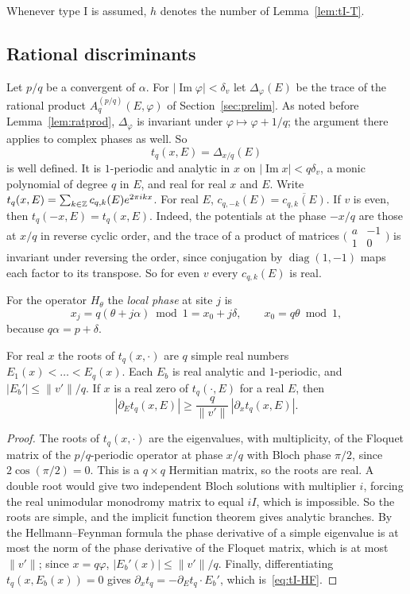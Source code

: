 Whenever type I is assumed, $h$ denotes the number of Lemma~\ref{lem:tI-T}.

\subsection{Rational discriminants}\label{sec:tI-disc}

Let $p/q$ be a convergent of $\alpha$. For $|\operatorname{Im}\varphi|<\delta_v$ let $\Delta_\varphi(E)$ be the trace of the rational product $A^{(p/q)}_q(E,\varphi)$ of Section~\ref{sec:prelim}. As noted before Lemma~\ref{lem:ratprod}, $\Delta_\varphi$ is invariant under $\varphi\mapsto\varphi+1/q$; the argument there applies to complex phases as well. So
\[
t_q(x,E)=\Delta_{x/q}(E)
\]
is well defined. It is $1$-periodic and analytic in $x$ on $|\operatorname{Im}x|<q\delta_v$, a monic polynomial of degree $q$ in $E$, and real for real $x$ and $E$. Write $t_q(x,E)=\sum_{k\in\mathbb Z}c_{q,k}(E)e^{2\pi ikx}$. For real $E$, $c_{q,-k}(E)=\overline{c_{q,k}(E)}$. If $v$ is even, then $t_q(-x,E)=t_q(x,E)$. Indeed, the potentials at the phase $-x/q$ are those at $x/q$ in reverse cyclic order, and the trace of a product of matrices $\bigl(\begin{smallmatrix}a&-1\\1&0\end{smallmatrix}\bigr)$ is invariant under reversing the order, since conjugation by $\operatorname{diag}(1,-1)$ maps each factor to its transpose. So for even $v$ every $c_{q,k}(E)$ is real.

For the operator $H_\theta$ the \emph{local phase} at site $j$ is
\[
x_j=q(\theta+j\alpha)\bmod1=x_0+j\delta,\qquad x_0=q\theta\bmod 1,
\]
because $q\alpha=p+\delta$.

\begin{lemma}\label{lem:tI-bc}
For real $x$ the roots of $t_q(x,\cdot)$ are $q$ simple real numbers $E_1(x)<\dots<E_q(x)$. Each $E_b$ is real analytic and $1$-periodic, and $|E_b'|\le\|v'\|/q$. If $x$ is a real zero of $t_q(\cdot,E)$ for a real $E$, then
\begin{equation}\label{eq:tI-HF}
|\partial_Et_q(x,E)|\ge\frac{q}{\|v'\|}\,|\partial_xt_q(x,E)|.
\end{equation}
\end{lemma}

\begin{proof}
The roots of $t_q(x,\cdot)$ are the eigenvalues, with multiplicity, of the Floquet matrix of the $p/q$-periodic operator at phase $x/q$ with Bloch phase $\pi/2$, since $2\cos(\pi/2)=0$. This is a $q\times q$ Hermitian matrix, so the roots are real. A double root would give two independent Bloch solutions with multiplier $i$, forcing the real unimodular monodromy matrix to equal $iI$, which is impossible. So the roots are simple, and the implicit function theorem gives analytic branches. By the Hellmann--Feynman formula the phase derivative of a simple eigenvalue is at most the norm of the phase derivative of the Floquet matrix, which is at most $\|v'\|$; since $x=q\varphi$, $|E_b'(x)|\le\|v'\|/q$. Finally, differentiating $t_q(x,E_b(x))=0$ gives $\partial_xt_q=-\partial_Et_q\cdot E_b'$, which is~\eqref{eq:tI-HF}.
\end{proof}

